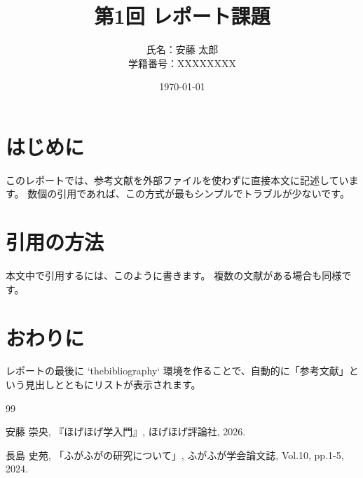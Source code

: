 \documentclass[a4paper,11pt]{ltjsarticle}
\title{第1回 レポート課題}
\author{氏名：安藤 太郎 \\ 学籍番号：XXXXXXXX}
\date{\today}
\begin{document}
\maketitle


\section{はじめに}
このレポートでは、参考文献を外部ファイルを使わずに直接本文に記述しています。
数個の引用であれば、この方式が最もシンプルでトラブルが少ないです。

\section{引用の方法}
本文中で引用するには、このように書きます\cite{book1}。
複数の文献がある場合も同様です\cite{paper1}。

\section{おわりに}
レポートの最後に `thebibliography` 環境を作ることで、自動的に「参考文献」という見出しとともにリストが表示されます。

\begin{thebibliography}{99}

    安藤 崇央, 『ほげほげ学入門』, ほげほげ評論社, 2026.

    長島 史苑, 「ふがふがの研究について」, ふがふが学会論文誌, Vol.10, pp.1-5, 2024.

\end{thebibliography}
\end{document}
